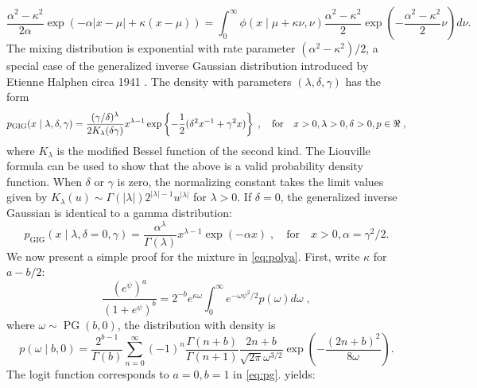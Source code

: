 \documentclass[lineno]{biometrika}
\begin{document}
\begin{equation*}
  \frac{\alpha^2-\kappa^2}{2\alpha} \exp\left(-\alpha|x-\mu| + \kappa(x-\mu)\right) 
  = \int_0^{\infty} \phi(x \mid \mu + \kappa \nu, \nu) 
  \frac{\alpha^2-\kappa^2}{2} \exp\left(-\frac{\alpha^2-\kappa^2}{2} \nu \right) d \nu. 
\end{equation*}
The mixing distribution is exponential with rate parameter
$(\alpha^2-\kappa^2)/2$, a special case of the generalized inverse Gaussian
distribution introduced by Etienne Halphen circa 1941
\citep{seshadri1997halphen}.  The density with parameters $(\lambda, \delta, \gamma)$ 
has the form 
\begin{equation*}
  p_{\mathrm{GIG}}(x \mid \lambda, \delta, \gamma) = 
  \frac{(\gamma/\delta)^{\lambda}}{2 K_{\lambda}(\delta \gamma)} x^{\lambda-1} 
  \exp\left\{ -\half (\delta^2 x^{-1} + \gamma^2 x )\right\}
  \;, 
  \quad\text{for}\quad x > 0, \lambda >0, \delta > 0,  p \in \Re
  \;,
\end{equation*}
where $K_{\lambda}$ is the modified Bessel function of the second kind.  The
Liouville formula can be used to show that the above is a valid probability density
function.  When $\delta$ or $\gamma$ is zero, the normalizing constant takes 
the limit values given by
$K_{\lambda}(u) \sim \Gamma(|\lambda|) 2^{|\lambda|-1} u^{|\lambda|}$ 
for $\lambda > 0$.  If $\delta=0$, the generalized
inverse Gaussian is identical to a gamma distribution:
$$
p_{\mathrm{GIG}}(x \mid \lambda, \delta = 0 , \gamma) 
= \frac{\alpha^{\lambda}}{\Gamma(\lambda)} x^{\lambda-1} \exp(-\alpha x) 
\;, \quad\text{for}\quad x > 0, \alpha = \gamma^2 / 2.
$$
%
We now present a simple proof for the \PG{} mixture in \eqref{eq:polya}. 
First, write $\kappa$ for $a-b/2$: 
\begin{equation}
  \frac{(e^{\psi})^a}{(1+e^{\psi})^b} = 2^{-b} e^{\kappa \omega} 
  \int_0^{\infty} e^{-\omega \psi^2/2} p(\omega) d\omega
  \;, 
  \label{eq:pg}
\end{equation}
where $\omega \sim \operatorname{PG}(b,0)$, the \PG{} distribution with density is
$$
p(\omega \mid b, 0) = \frac{2^{b-1}}{\Gamma(b)} 
\sum_{n=0}^{\infty} (-1)^n \frac{\Gamma(n+b)}{\Gamma(n+1)} 
\frac{2n + b}{\sqrt{2 \pi} \omega^{3/2}} 
\exp\left(-\frac{(2 n + b)^2}{8 \omega} \right).
$$
The logit function corresponds to $a=0,b=1$ in \eqref{eq:pg}. \CS{} yields:  
\end{document}
